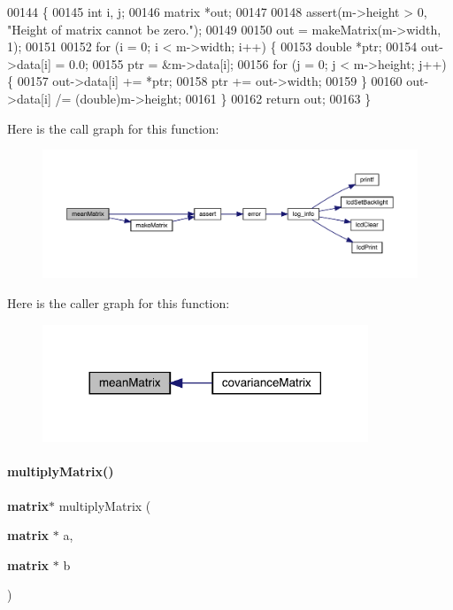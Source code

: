 \begin{DoxyCode}
00144                               \{
00145   \textcolor{keywordtype}{int} i, j;
00146   matrix *out;
00147 
00148   assert(m->height > 0, \textcolor{stringliteral}{"Height of matrix cannot be zero."});
00149 
00150   out = makeMatrix(m->width, 1);
00151 
00152   \textcolor{keywordflow}{for} (i = 0; i < m->width; i++) \{
00153     \textcolor{keywordtype}{double} *ptr;
00154     out->data[i] = 0.0;
00155     ptr = &m->data[i];
00156     \textcolor{keywordflow}{for} (j = 0; j < m->height; j++) \{
00157       out->data[i] += *ptr;
00158       ptr += out->width;
00159     \}
00160     out->data[i] /= (double)m->height;
00161   \}
00162   \textcolor{keywordflow}{return} out;
00163 \}
\end{DoxyCode}
Here is the call graph for this function\+:
\nopagebreak
\begin{figure}[H]
\begin{center}
\leavevmode
\includegraphics[width=350pt]{matrix_8h_ae4babf9b518a2d5d6b12776191e3b7de_cgraph}
\end{center}
\end{figure}
Here is the caller graph for this function\+:
\nopagebreak
\begin{figure}[H]
\begin{center}
\leavevmode
\includegraphics[width=276pt]{matrix_8h_ae4babf9b518a2d5d6b12776191e3b7de_icgraph}
\end{center}
\end{figure}
\mbox{\label{matrix_8h_a63ed5c518b34768e9ef8e9d5f7d0b534}} 
\paragraph{multiply\+Matrix()}
{\footnotesize\ttfamily \textbf{ matrix}$\ast$ multiply\+Matrix (\begin{DoxyParamCaption}\item[{\textbf{ matrix} $\ast$}]{a,  }\item[{\textbf{ matrix} $\ast$}]{b }\end{DoxyParamCaption})}



